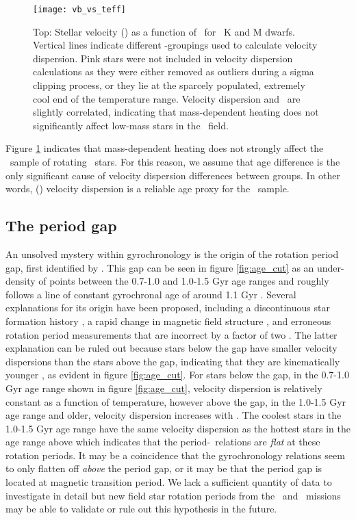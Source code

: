 \begin{figure}
  \caption{
      Top: Stellar velocity (\vb) as a function of \teff\ for
      \kepler\ K and M dwarfs.
Vertical lines indicate different \teff-groupings used to calculate velocity
    dispersion.
Pink stars were not included in velocity dispersion calculations as they were
    either removed as outliers during a sigma clipping process, or they lie at
    the sparcely populated, extremely cool end of the temperature range.
    Velocity dispersion and \teff\ are slightly correlated,
    indicating that mass-dependent heating does not significantly affect
    low-mass stars in the \kepler\ field.
}
  \centering
    \texttt{[image: vb\_vs\_teff]}
\label{fig:vb_vs_teff}
\end{figure}
Figure \ref{fig:vb_vs_teff} indicates that mass-dependent heating does not
strongly affect the \mct\ sample of rotating \kepler\ stars.
For this reason, we assume that age difference is the only significant cause
of velocity dispersion differences between groups.
In other words, (\vb) velocity dispersion is a reliable age proxy for the
\mct\ sample.

\subsection{The period gap}
An unsolved mystery within gyrochronology is the origin of the rotation period
gap, first identified by \citet{mcquillan2013}.
This gap can be seen in figure \ref{fig:age_cut} as an under-density of points
between the 0.7-1.0 and 1.0-1.5 Gyr age ranges and roughly follows a line of
constant gyrochronal age of around 1.1 Gyr \citep[according to
the gyrochronology relation of][]{angus2019}.
Several explanations for its origin have been proposed, including a
discontinuous star formation history \citep{mcquillan2013, davenport2017,
davenport2018}, a rapid change in magnetic field structure
\citep{reinhold2019}, and erroneous rotation period measurements that are
incorrect by a factor of two \citep{koen2018}.
The latter explanation can be ruled out because stars below the gap have
smaller velocity dispersions than the stars above the gap, indicating that
they are kinematically younger \citep{mcquillan2013, davenport2018}, as
evident in figure \ref{fig:age_cut}.
For stars below the gap, in the 0.7-1.0 Gyr age range shown in figure
\ref{fig:age_cut}, velocity dispersion is relatively constant as a function of
temperature, however above the gap, in the 1.0-1.5 Gyr age range and older,
velocity dispersion increases with \teff.
The coolest stars in the 1.0-1.5 Gyr age range have the same velocity
dispersion as the hottest stars in the age range above which indicates that
the period-\teff\ relations are {\it flat} at these rotation periods.
It may be a coincidence that the gyrochronology relations seem to only flatten
off {\it above} the period gap, or it may be that the period gap is located at
magnetic transition period.
We lack a sufficient quantity of data to investigate in detail but new field
star rotation periods from the \ktwo\ and \tess\ missions may be able to
validate or rule out this hypothesis in the future.


